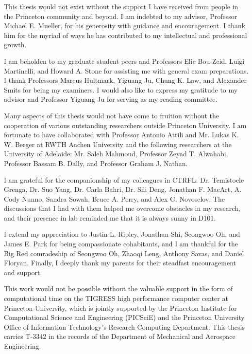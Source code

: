 This thesis would not exist without the support I have received from people in the Princeton community and beyond. I am indebted to my advisor, Professor Michael E. Mueller, for his generosity with guidance and encouragement. I thank him for the myriad of ways he has contributed to my intellectual and professional growth.

I am beholden to my graduate student peers and Professors Elie Bou-Zeid, Luigi Martinelli, and Howard A. Stone for assisting me with general exam preparations. I thank Professors Marcus Hultmark, Yiguang Ju, Chung K. Law, and Alexander Smits for being my examiners. I would also like to express my gratitude to my advisor and Professor Yiguang Ju for serving as my reading committee.

Many aspects of this thesis would not have come to fruition without the cooperation of various outstanding researchers outside Princeton University. I am fortunate to have collaborated with Professor Antonio Attili and Mr. Lukas K. W. Berger at RWTH Aachen University and the following researchers at the University of Adelaide: Mr. Saleh Mahmoud, Professor Zeyad T. Alwahabi, Professor Bassam B. Dally, and Professor Graham J. Nathan.

I am grateful for the companionship of my colleagues in CTRFL: Dr. Temistocle Grenga, Dr. Suo Yang, Dr. Carla Bahri, Dr. Sili Deng, Jonathan F. MacArt, A. Cody Nunno, Sandra Sowah, Bruce A. Perry, and Alex G. Novoselov. The discussions that I had with them helped me overcome obstacles in my research, and their presence in lab reminded me that it is always sunny in D101.

I extend my appreciation to Justin L. Ripley, Jonathan Shi, Seongwoo Oh, and James E. Park for being compassionate cohabitants, and I am thankful for the Big Red comradeship of Seongwoo Oh, Zhaoqi Leng, Anthony Savas, and Daniel Floryan. Finally, I deeply thank my parents for their steadfast encouragement and support.

This work would not be possible without the valuable support in the form of computational time on the TIGRESS high performance computer center at Princeton University, which is jointly supported by the Princeton Institute for Computational Science and Engineering (PICSciE) and the Princeton University Office of Information Technology's Research Computing Department. This thesis carries T-3342 in the records of the Department of Mechanical and Aerospace Engineering.


